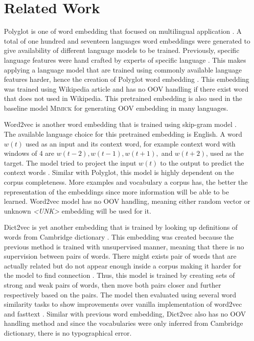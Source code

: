 \chapter{Related Work}
\label{chap:relatedwork}

Polyglot is one of word embedding that focused on multilingual
application \citep{polyglot2013alrfou}. A total of one hundred and
seventeen languages word embeddings were generated to give
availability of different language models to be trained. Previously,
specific language features were hand crafted by experts of specific
language \citep{polyglot2013alrfou}. This makes applying a language
model that are trained using commonly available language features
harder, hence the creation of Polyglot word embedding
\citep{polyglot2013alrfou}. This embedding was trained using Wikipedia
article and has no OOV handling if there exist word that does not used
in Wikipedia. This pretrained embedding is also used in the baseline
model \textsc{Mimick} for generating OOV embedding in many languages.

Word2vec is another word embedding that is trained using skip-gram
model \citep{efficient2013mikolov}. The available language choice for
this pretrained embedding is English. A word $w(t)$ used as an input
and its context word, for example context word with windows of 4 are
$w(t-2), w(t-1), w(t+1),$ and $w(t+2)$, used as the target. The model
tried to project the input $w(t)$ to the output to predict the context
words \citep{efficient2013mikolov}. Similar with Polyglot, this model
is highly dependent on the corpus completeness. More examples and
vocabulary a corpus has, the better the representation of the
embeddings since more information will be able to be learned. Word2vec
model has no OOV handling, meaning either random vector or unknown
\textit{\textless UNK\textgreater} embedding will be used for it.

Dict2vec is yet another embedding that is trained by looking up
definitions of words from Cambridge dictionary
\citep{tissier2017dict2vec}. This embedding was created because the
previous method is trained with unsupervised manner, meaning that
there is no supervision between pairs of words. There might exists
pair of words that are actually related but do not appear enough
inside a corpus making it harder for the model to find connection
\citep{tissier2017dict2vec}. Thus, this model is trained by creating
sets of strong and weak pairs of words, then move both pairs closer
and further respectively based on the pairs. The model then evaluated
using several word similarity tasks to show improvements over vanilla
implementation of word2vec and fasttext \citep{tissier2017dict2vec}.
Similar with previous word embedding, Dict2vec also has no OOV
handling method and since the vocabularies were only inferred from
Cambridge dictionary, there is no typographical error.

